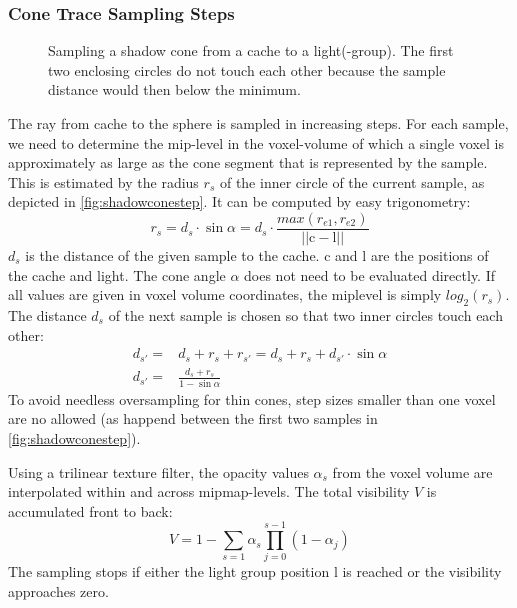 \documentclass[thesis.tex]{subfiles}
\begin{document}
\subsubsection{Cone Trace Sampling Steps}
\begin{figure}[h]
	\centering
	\caption{Sampling a shadow cone from a cache to a light(-group). The first two enclosing circles do not touch each other because the sample distance would then below the minimum.} \label{fig:shadowconestep}
\end{figure}
The ray from cache to the sphere is sampled in increasing steps.
For each sample, we need to determine the mip-level in the voxel-volume of which a single voxel is approximately as large as the cone segment that is represented by the sample.
This is estimated by the radius $r_s$ of the inner circle of the current sample, as depicted in \autoref{fig:shadowconestep}.
It can be computed by easy trigonometry:
\begin{equation}
r_s = d_s \cdot \sin \alpha = d_s \cdot \frac{max(r_{e1}, r_{e2})}{||\mathrm{c} - \mathrm{l}||}
\end{equation}
$d_s$ is the distance of the given sample to the cache. $\mathrm{c}$ and $\mathrm{l}$ are the positions of the cache and light.
The cone angle $\alpha$ does not need to be evaluated directly. %
If all values are given in voxel volume coordinates, the miplevel is simply $log_2(r_s)$.\\
The distance $d_s$ of the next sample is chosen so that two inner circles touch each other:
\begin{align}
d_{s'} =& d_s + r_s + r_{s'} = d_s + r_s + d_{s'} \cdot \sin \alpha\\
d_{s'} =& \frac{d_s + r_s}{1-\sin\alpha}
\end{align}
To avoid needless oversampling for thin cones, step sizes smaller than one voxel are no allowed (as happend between the first two samples in \autoref{fig:shadowconestep}).

Using a trilinear texture filter, the opacity values $\alpha_s$ from the voxel volume are interpolated within and across mipmap-levels.
The total visibility $V$ is accumulated front to back:
\begin{equation}
V = 1 - \sum\limits_{s=1}\alpha_s \prod\limits_{j=0}^{s-1}(1-\alpha_j)
\end{equation}
The sampling stops if either the light group position $\mathrm{l}$ is reached or the visibility approaches zero.
\end{document}
